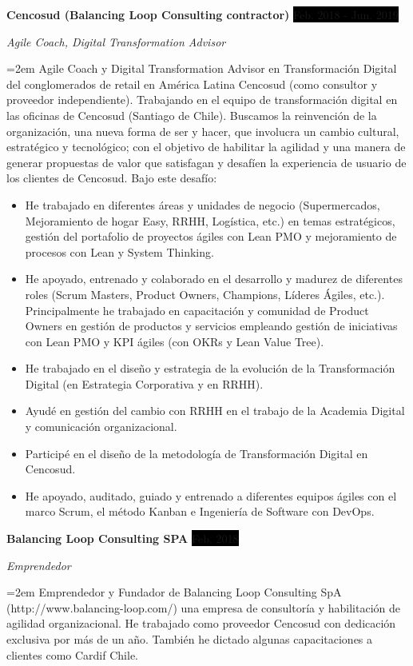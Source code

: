\documentclass[paper=a4,fontsize=11pt]{scrartcl} %
\newcommand{\EducationEntry}[4]{
		\noindent \textbf{#1} \hfill      %
		\colorbox{Black}{%
			\parbox{6em}{%
			\hfill\color{White}#2}} \par  %
		\noindent \textit{#3} \par        %
		\noindent\hangindent=2em\hangafter=0 \small #4 %
		\normalsize \par}
\newcommand{\WorkEntry}[4]{				  %
		\noindent \textbf{#1} \hfill      %
		\colorbox{Black}{\color{White}#2} \par  %
		\noindent \textit{#3} \par              %
		\noindent\hangindent=2em\hangafter=0 \small #4 %
		\normalsize \par}
\begin{document}
\WorkEntry{Cencosud (Balancing Loop Consulting contractor)}{Feb. 2018 - Jun. 2019}{Agile Coach, Digital Transformation Advisor}{
Agile Coach y Digital Transformation Advisor en Transformación Digital del conglomerados de retail en América Latina Cencosud (como consultor y proveedor independiente). Trabajando en el equipo de transformación digital en las oficinas de Cencosud (Santiago de Chile). Buscamos la reinvención de la organización, una nueva forma de ser y hacer, que involucra un cambio cultural, estratégico y tecnológico; con el objetivo de habilitar la agilidad y una manera de generar propuestas de valor que satisfagan y desafíen la experiencia de usuario de los clientes de Cencosud. Bajo este desafío: 
\begin{itemize}
\item He trabajado en diferentes áreas y unidades de negocio (Supermercados, Mejoramiento de hogar Easy, RRHH, Logística, etc.) en temas estratégicos, gestión del portafolio de proyectos ágiles con Lean PMO y mejoramiento de procesos con Lean y System Thinking. 
\item He apoyado, entrenado y colaborado en el desarrollo y madurez de diferentes roles (Scrum Masters, Product Owners, Champions, Líderes Ágiles, etc.). Principalmente he trabajado en capacitación y comunidad de Product Owners en gestión de productos y servicios empleando gestión de iniciativas con Lean PMO y KPI ágiles (con OKRs y Lean Value Tree).
\item He trabajado en el diseño y estrategia de la evolución de la Transformación Digital (en Estrategia Corporativa y en RRHH). 
\item Ayudé en gestión del cambio con RRHH en el trabajo de la Academia Digital y comunicación organizacional. 
\item Participé en el diseño de la metodología de Transformación Digital en Cencosud.
\item He apoyado, auditado, guiado y entrenado a diferentes equipos ágiles con el marco Scrum, el método Kanban e Ingeniería de Software con DevOps.
\end{itemize}
}

\WorkEntry{Balancing Loop Consulting SPA}{Feb. 2018}{Emprendedor}{
Emprendedor y Fundador de Balancing Loop Consulting SpA (http://www.balancing-loop.com/) una empresa de consultoría y habilitación de agilidad organizacional. He trabajado como proveedor Cencosud con dedicación exclusiva por más de un año. También he dictado algunas capacitaciones a clientes como Cardif Chile.
}
\end{document}
